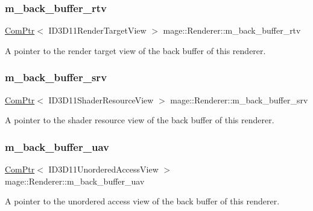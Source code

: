 \subsubsection{\texorpdfstring{m\+\_\+back\+\_\+buffer\+\_\+rtv}{m\_back\_buffer\_rtv}}
{\footnotesize\ttfamily \hyperlink{namespacemage_ae74f374780900893caa5555d1031fd79}{Com\+Ptr}$<$ I\+D3\+D11\+Render\+Target\+View $>$ mage\+::\+Renderer\+::m\+\_\+back\+\_\+buffer\+\_\+rtv\hspace{0.3cm}{\ttfamily [private]}}

A pointer to the render target view of the back buffer of this renderer. \hypertarget{classmage_1_1_renderer_adddf1283111a3c43a7957411688136b8}{}\label{classmage_1_1_renderer_adddf1283111a3c43a7957411688136b8} 
\subsubsection{\texorpdfstring{m\+\_\+back\+\_\+buffer\+\_\+srv}{m\_back\_buffer\_srv}}
{\footnotesize\ttfamily \hyperlink{namespacemage_ae74f374780900893caa5555d1031fd79}{Com\+Ptr}$<$ I\+D3\+D11\+Shader\+Resource\+View $>$ mage\+::\+Renderer\+::m\+\_\+back\+\_\+buffer\+\_\+srv\hspace{0.3cm}{\ttfamily [private]}}

A pointer to the shader resource view of the back buffer of this renderer. \hypertarget{classmage_1_1_renderer_a1f62a5eb350d14f7c66022dd45f553e0}{}\label{classmage_1_1_renderer_a1f62a5eb350d14f7c66022dd45f553e0} 
\subsubsection{\texorpdfstring{m\+\_\+back\+\_\+buffer\+\_\+uav}{m\_back\_buffer\_uav}}
{\footnotesize\ttfamily \hyperlink{namespacemage_ae74f374780900893caa5555d1031fd79}{Com\+Ptr}$<$ I\+D3\+D11\+Unordered\+Access\+View $>$ mage\+::\+Renderer\+::m\+\_\+back\+\_\+buffer\+\_\+uav\hspace{0.3cm}{\ttfamily [private]}}

A pointer to the unordered access view of the back buffer of this renderer. \hypertarget{classmage_1_1_renderer_a8f5a70294790d4fbbb8237c587f88bb5}{}\label{classmage_1_1_renderer_a8f5a70294790d4fbbb8237c587f88bb5} 
